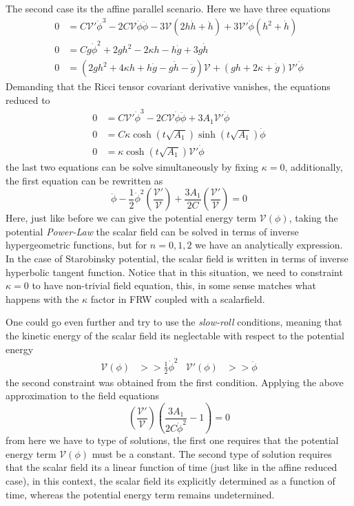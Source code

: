 \documentclass[10pt,a4paper]{article}
\begin{document}
The second case its the affine parallel scenario. Here we have three equations
\begin{align}
  0 & = C\mathcal{V}'\dot{\phi}^3-2C\mathcal{V}\dot{\phi}\ddot{\phi} - 3\mathcal{V}\left(2h\dot{h} + \ddot{h}\right) + 3\mathcal{V}'\dot{\phi}
  \left(h^{2} + \dot{h}\right) \\
  0 & = Cg\dot{\phi}^2 + 2gh^2 - 2\kappa h - h\dot{g} + 3g\dot{h} \\
  0 & = \left(2gh^2 + 4\kappa h +h\dot{g} - g \dot{h} - \ddot{g}\right)\mathcal{V} + \left(gh + 2\kappa + \dot{g}\right)\mathcal{V}'\dot{\phi}
\end{align}
Demanding that the Ricci tensor covariant derivative vanishes, the equations reduced to
\begin{align}
  0 & = C\mathcal{V}'\dot{\phi}^3 - 2C\mathcal{V}\dot{\phi}\ddot{\phi} + 3A_1 \mathcal{V}'\dot{\phi}\\
  0 & = C\kappa \cosh(t\sqrt{A_1})\sinh(t\sqrt{A_1})\dot{\phi} \\
  0 & = \kappa \cosh(t\sqrt{A_1})\mathcal{V}'\dot{\phi}
\end{align}
the last two equations can be solve simultaneously by fixing $\kappa = 0$, additionally, the first equation can be rewritten as
\begin{equation}
  \ddot{\phi} - \frac{1}{2}\dot{\phi}^2\left(\frac{\mathcal{V}'}{\mathcal{V}}\right) + \frac{3A_1}{2C}\left(\frac{\mathcal{V}'}{\mathcal{V}}\right) = 0
\end{equation}
Here, just like before we can give the potential energy term $\mathcal{V}(\phi)$, taking the potential \textit{Power-Law} the scalar field
can be solved in terms of inverse hypergeometric functions, but for $n = 0 , 1 , 2$ we have an analytically expression. In the case of Starobinsky
potential, the scalar field is written in terms of inverse hyperbolic tangent function. Notice that in this situation, we need to constraint $\kappa = 0$ to have non-trivial field equation, this, in some sense matches what
happens with the $\kappa$ factor in FRW coupled with a scalarfield. 

One could go even further and try to use the \textit{slow-roll} conditions, meaning that the kinetic energy of the scalar field its 
neglectable with respect to the potential energy
\begin{align}
  \mathcal{V}(\phi) & >> \frac{1}{2}\dot{\phi}^2 & \mathcal{V}'(\phi) & >> \ddot{\phi}
\end{align}
the second constraint was obtained from the first condition. Applying the above approximation to the field equations
\begin{equation}
  \left(\frac{\mathcal{V}'}{\mathcal{V}}\right)\left(\frac{3A_1}{2C\dot{\phi}^2} -1 \right)= 0
\end{equation}
from here we have to type of solutions, the first one requires that the potential energy term $\mathcal{V}(\phi)$ must be a constant. The second
type of solution requires that the scalar field its a linear function of time (just like in the affine reduced case), in this context, the scalar field its explicitly determined
as a function of time, whereas the potential energy term remains undetermined. 
\end{document}
